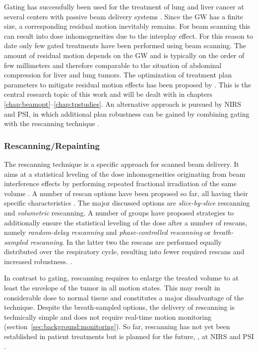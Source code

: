 Gating has successfully been used for the treatment of lung and liver
cancer at several centers with passive beam delivery systems
\citep{Iwata2010,Hashimoto2006}. Since the \ac{GW} has a finite size,
a corresponding residual motion inevitably remains. For beam scanning
this can result into dose inhomogeneities due to the interplay
effect. For this reason to date only few gated treatments have been
performed using beam scanning. The amount of residual motion depends
on the \ac{GW} and is typically on the order of few millimeters and
therefore comparable to the situation of abdominal compression for
liver and lung tumors. The optimization of treatment plan parameters
to mitigate residual motion effects has been proposed by
\citet{Bert2009}. This is the central research topic of this work and
will be dealt with in chapters
\ref{chap:beamopt}--\ref{chap:tpstudies}. An alternative approach
is pursued by \ac{NIRS} and \ac{PSI}, in which additional plan
robustness can be gained by combining gating with the rescanning
technique \citep{Furukawa2007,Zenklusen2010}.

%
%

\subsubsection{Rescanning/Repainting}
The rescanning technique is a specific approach for scanned beam
delivery. It aims at a statistical leveling of the dose
inhomogeneities originating from beam interference effects by
performing repeated fractional irradiation of the same volume
\citep{Phillips1992}. A number of rescan options have been proposed so
far, all having their specific characteristics
\citep{Furukawa2007,Rietzel2010,Zenklusen2010}. The major discussed
options are \emph{slice-by-slice} rescanning and \emph{volumetric}
rescanning. A number of groups have proposed strategies to
additionally ensure the statistical leveling of the dose after a
number of rescans, namely \emph{random-delay rescanning}
\citep{Seco2009,Rietzel2010} and \emph{phase-controlled rescanning} or
\emph{breath-sampled rescanning}. In the latter two the rescans are
performed equally distributed over the respiratory cycle, resulting
into fewer required rescans and increased robustness.
\citep{Furukawa2010,Seco2009}.

In contrast to gating, rescanning requires to enlarge the treated
volume to at least the envelope of the tumor in all motion
states. This may result in considerable dose to normal tissue and
constitutes a major disadvantage of the technique. Despite the
breath-sampled options, the delivery of rescanning is technically
simple and does not require real-time motion monitoring
(section~\ref{sec:background:monitoring}). So far, rescanning has not
yet been established in patient treatments but is planned for the
future, \eg, at \ac{NIRS} \citep{Furukawa2007} and \ac{PSI}
\citep{Zenklusen2010}.

